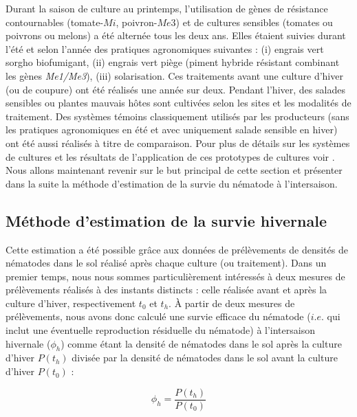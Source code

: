 	Durant la saison de culture au printemps,  l'utilisation de gènes de résistance contournables (tomate-$Mi$, poivron-$Me3$) et de cultures sensibles (tomates ou poivrons ou melons) a  été alternée tous les deux ans. 
Elles étaient suivies durant l'été et selon l'année des pratiques agronomiques
suivantes : (i) engrais vert sorgho
biofumigant, (ii) engrais vert piège (piment hybride résistant combinant les gènes \textit{Me1/Me3}), (iii) solarisation. Ces traitements   avant une culture d'hiver (ou de coupure) ont été réalisés une année sur deux. Pendant l'hiver,  des salades sensibles ou plantes mauvais hôtes  sont cultivées  selon les sites et les modalités de traitement. Des systèmes témoins classiquement utilisés par les producteurs (sans les pratiques agronomiques en été et avec uniquement salade sensible en hiver) ont été aussi réalisés à titre de comparaison.    Pour plus de détails sur les systèmes de cultures et les résultats de l'application de ces prototypes de cultures voir \citet{Djian-Caporalino2019}. Nous allons maintenant revenir sur le but principal de cette section et présenter dans la suite la méthode d'estimation de la survie du nématode à l'intersaison.
	 
\subsection{ Méthode d'estimation de la survie hivernale} \label{estimation}

	Cette estimation a été possible grâce  aux données de prélèvements de densités de nématodes dans le sol réalisé  après chaque culture (ou traitement).
Dans un premier temps, nous nous sommes particulièrement intéressés à deux mesures de prélèvements   réalisés à des instants distincts : celle réalisée avant  et après  la culture d'hiver, respectivement $t_0$ et $t_h$. À partir de deux mesures de prélèvements, nous  avons donc calculé une survie efficace du nématode ($i.e.$ qui inclut une éventuelle reproduction résiduelle du nématode)  à l'intersaison hivernale ($\phi_h$)  comme étant 
la densité de nématodes dans le sol  après la culture d'hiver  $P(t_h)$ divisée   par 
la densité de nématodes dans le sol avant la culture d'hiver $P(t_0)$ :
	
	 \begin{equation} 
	 \phi_h = \dfrac{P(t_h)}{P(t_0)}
	 \label{phi1}
	 \end{equation} 
	  
